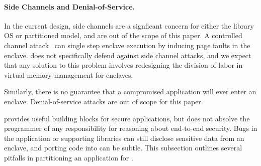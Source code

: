 
\paragraph{Side Channels and Denial-of-Service.}
In the current \sgx{} design, side channels are a signficant concern for either the library OS or partitioned model, and are out of the scope of this paper.
A controlled channel attack~ can single step enclave execution by inducing page faults
in the enclave.  \sysname{} does not specifically defend against side channel attacks,
and we expect that any solution to this problem involves redesigning the division of labor in virtual
memory management for enclaves.

Similarly, there is no guarantee that a compromised application will ever enter
an enclave.  Denial-of-service attacks are out of scope for this paper.



\sgx{} provides useful building blocks for secure applications, but does not
absolve the programmer of any responsibility for reasoning about end-to-end security.
Bugs in the application or supporting libraries can still disclose sensitive data from an enclave,
and porting code into \sgx{} can be subtle.
This subsection outlines several pitfalls in partitioning an application for \sgx{}.


